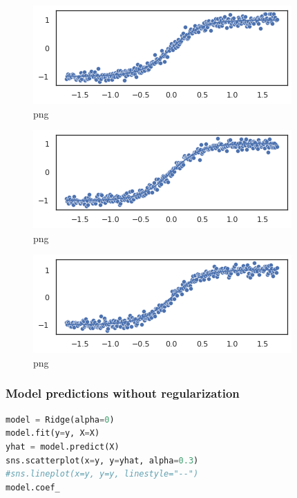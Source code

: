 \begin{figure}
\centering
\includegraphics{normality_and_linearity_violation_files/normality_and_linearity_violation_3_1.png}
\caption{png}
\end{figure}

\begin{figure}
\centering
\includegraphics{normality_and_linearity_violation_files/normality_and_linearity_violation_3_2.png}
\caption{png}
\end{figure}

\begin{figure}
\centering
\includegraphics{normality_and_linearity_violation_files/normality_and_linearity_violation_3_3.png}
\caption{png}
\end{figure}

\hypertarget{model-predictions-without-regularization}{%
\subsubsection{\texorpdfstring{Model predictions \textbf{without}
regularization}{Model predictions without regularization}}\label{model-predictions-without-regularization}}

\begin{lstlisting}[language=Python]
model = Ridge(alpha=0)
model.fit(y=y, X=X)
yhat = model.predict(X)
sns.scatterplot(x=y, y=yhat, alpha=0.3)
#sns.lineplot(x=y, y=y, linestyle="--")
model.coef_
\end{lstlisting}

